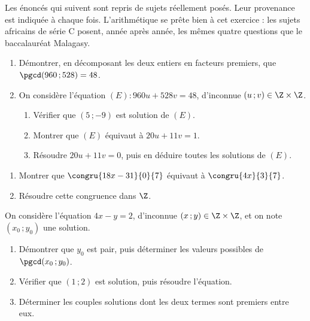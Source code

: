 \begin{annales}
Les énoncés qui suivent sont repris de sujets réellement posés. Leur
provenance est indiquée à chaque fois. L'arithmétique se prête bien à cet
exercice : les sujets africains de série C posent, année après année, les
mêmes quatre questions que le baccalauréat Malagasy.

\begin{enumerate}[label=\textbf{\arabic*)}, leftmargin=*, itemsep=0.15em]
  \item Démontrer, en décomposant les deux entiers en facteurs premiers, que
        $\pgcd(960\,;528) = 48$.
  \item On considère l'équation $(E) : 960u+528v = 48$, d'inconnue
        $(u\,;v) \in \Z\times\Z$.
        \begin{enumerate}[label=\textbf{\alph*)}, leftmargin=1.4em]
          \item Vérifier que $(5\,;-9)$ est solution de $(E)$.
          \item Montrer que $(E)$ équivaut à $20u+11v = 1$.
          \item Résoudre $20u+11v = 0$, puis en déduire toutes les solutions
                de $(E)$.
        \end{enumerate}
\end{enumerate}

\begin{enumerate}[label=\textbf{\alph*)}, leftmargin=*, itemsep=0.15em]
  \item Montrer que $\congru{18x-31}{0}{7}$ équivaut à $\congru{4x}{3}{7}$.
  \item Résoudre cette congruence dans $\Z$.
\end{enumerate}

On considère l'équation $4x-y = 2$, d'inconnue $(x\,;y) \in \Z\times\Z$, et on
note $(x_{0}\,;y_{0})$ une solution.
\begin{enumerate}[label=\textbf{\arabic*)}, leftmargin=*, itemsep=0.15em]
  \item Démontrer que $y_{0}$ est pair, puis déterminer les valeurs possibles
        de $\pgcd(x_{0}\,;y_{0})$.
  \item Vérifier que $(1\,;2)$ est solution, puis résoudre l'équation.
  \item Déterminer les couples solutions dont les deux termes sont premiers
        entre eux.
\end{enumerate}


\end{annales}
